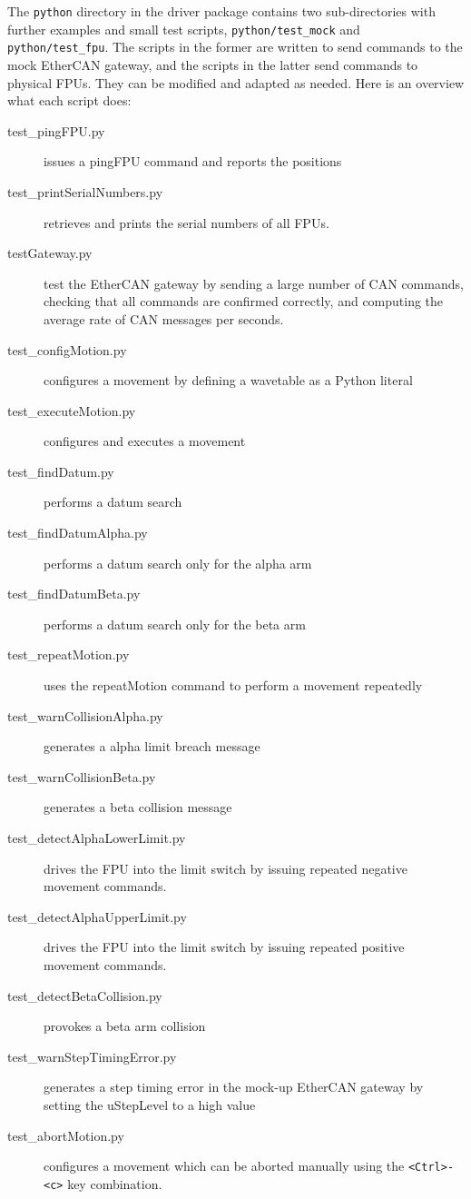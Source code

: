 \documentclass[fontsize=12,a4paper]{scrreprt}
\begin{document}
The \texttt{python} directory in the driver package contains
two sub-directories with further examples and small test scripts,
\texttt{python/test\_mock} and \texttt{python/test\_fpu}. The scripts in
the former are written to send commands to the mock EtherCAN
gateway, and the scripts in the latter send commands
to physical FPUs. They can be modified and adapted
as needed. Here is an overview what each script does:

\begin{description}
\item[test\_pingFPU.py] issues a pingFPU command and reports the positions
\item[test\_printSerialNumbers.py] retrieves and prints the serial numbers of all FPUs.
\item[testGateway.py] test the EtherCAN gateway by sending a large
  number of CAN commands, checking that all commands are confirmed
  correctly, and computing the average rate of CAN messages per seconds.
\item[test\_configMotion.py] configures a movement by defining a wavetable as a Python literal
\item[test\_executeMotion.py] configures and executes a movement
\item[test\_findDatum.py] performs a datum search
\item[test\_findDatumAlpha.py] performs a datum search only for the alpha arm
\item[test\_findDatumBeta.py] performs a datum search only for the beta arm
\item[test\_repeatMotion.py] uses the repeatMotion command to perform a movement repeatedly
\item[test\_warnCollisionAlpha.py] generates a alpha limit breach message
\item[test\_warnCollisionBeta.py] generates a beta collision message
\item[test\_detectAlphaLowerLimit.py] drives the FPU into the limit switch by issuing repeated negative movement commands.
\item[test\_detectAlphaUpperLimit.py] drives the FPU into the limit switch by issuing repeated positive movement commands.
\item[test\_detectBetaCollision.py] provokes a beta arm collision
\item[test\_warnStepTimingError.py] generates a step timing error
  in the mock-up EtherCAN gateway by setting the uStepLevel to a high
  value
\item[test\_abortMotion.py]  configures a movement which can be aborted
  manually using the \verb+<Ctrl>-<c>+ key combination.
\end{description}
\end{document}
